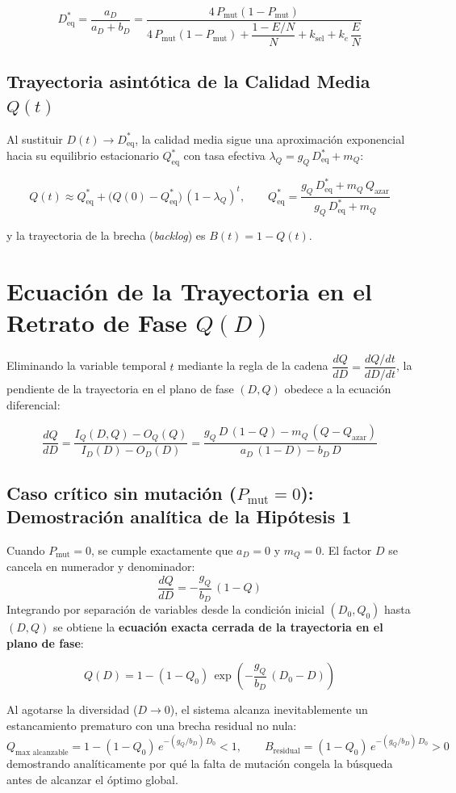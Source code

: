 \documentclass[11pt,letterpaper]{article}
\begin{document}
\begin{equation}
D^*_{\text{eq}} = \frac{a_D}{a_D + b_D} = \frac{4\,P_{\text{mut}}(1 - P_{\text{mut}})}{4\,P_{\text{mut}}(1 - P_{\text{mut}}) + \dfrac{1 - E/N}{N} + k_{\text{sel}} + k_e\,\dfrac{E}{N}}
\end{equation}

\subsection{Trayectoria asintótica de la Calidad Media $Q(t)$}
Al sustituir $D(t) \to D^*_{\text{eq}}$, la calidad media sigue una aproximación exponencial hacia su equilibrio estacionario $Q^*_{\text{eq}}$ con tasa efectiva $\lambda_Q = g_Q\,D^*_{\text{eq}} + m_Q$:

\begin{equation}
\boxed{
Q(t) \approx Q^*_{\text{eq}} + \big(Q(0) - Q^*_{\text{eq}}\big)\,(1 - \lambda_Q)^t,
\qquad
Q^*_{\text{eq}} = \frac{g_Q\,D^*_{\text{eq}} + m_Q\,Q_{\text{azar}}}{g_Q\,D^*_{\text{eq}} + m_Q}
}
\end{equation}

y la trayectoria de la brecha (\textit{backlog}) es $B(t) = 1 - Q(t)$.

\section{Ecuación de la Trayectoria en el Retrato de Fase $Q(D)$}

Eliminando la variable temporal $t$ mediante la regla de la cadena $\dfrac{dQ}{dD} = \dfrac{dQ/dt}{dD/dt}$, la pendiente de la trayectoria en el plano de fase $(D, Q)$ obedece a la ecuación diferencial:

\begin{equation}
\boxed{
\frac{dQ}{dD} = \frac{I_Q(D, Q) - O_Q(Q)}{I_D(D) - O_D(D)} = \frac{g_Q\,D\,(1 - Q) - m_Q\,(Q - Q_{\text{azar}})}{a_D\,(1 - D) - b_D\,D}
}
\end{equation}

\subsection{Caso crítico sin mutación ($P_{\text{mut}} = 0$): Demostración analítica de la Hipótesis 1}
Cuando $P_{\text{mut}} = 0$, se cumple exactamente que $a_D = 0$ y $m_Q = 0$. El factor $D$ se cancela en numerador y denominador:
\[
\frac{dQ}{dD} = -\frac{g_Q}{b_D}\,(1 - Q)
\]
Integrando por separación de variables desde la condición inicial $(D_0, Q_0)$ hasta $(D, Q)$ se obtiene la \textbf{ecuación exacta cerrada de la trayectoria en el plano de fase}:

\begin{equation}
\boxed{
Q(D) = 1 - (1 - Q_0)\,\exp\!\left(-\frac{g_Q}{b_D}\,(D_0 - D)\right)
}
\end{equation}

Al agotarse la diversidad ($D \to 0$), el sistema alcanza inevitablemente un estancamiento prematuro con una brecha residual no nula:
\[
Q_{\max\text{ alcanzable}} = 1 - (1 - Q_0)\,e^{-(g_Q / b_D)\,D_0} < 1,
\qquad
B_{\text{residual}} = (1 - Q_0)\,e^{-(g_Q / b_D)\,D_0} > 0
\]
demostrando analíticamente por qué la falta de mutación congela la búsqueda antes de alcanzar el óptimo global.
\end{document}
